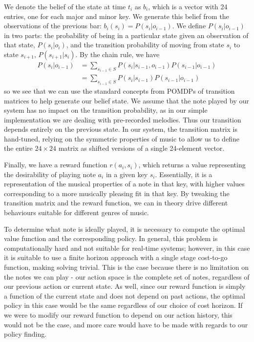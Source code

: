 \documentclass[11pt]{article} %
\begin{document}
We denote the belief of the state at time $t_i$ as $b_i$, which is a vector with 24 entries, one for each major and minor key. We generate this belief from the observations of the previous bar: $b_i(s_i) = P(s_i | o_{i-1})$.  We define $P(s_i | o_{i-1})$ in two parts: the probability of being in a particular state given an observation of that state, $P( s_i | o_i)$, and the transition probability of moving from state $s_i$ to state $s_{i+1}$, $P(s_{i+1} | s_{i})$. By the chain rule, we have
\begin{align*}
P(s_i | o_{i-1}) &= \sum_{s_{i-1} \in S} P(s_i | s_{i-1}, o_{i-1}) P( s_{i-1} | o_{i-1}) \\
&= \sum_{s_{i-1} \in S} P(s_i | s_{i-1}) P( s_{i-1} | o_{i-1})
\end{align*}
so we see that we can use the standard concepts from POMDPs of transition matrices to help generate our belief state. We assume that the note played by our system has no impact on the transition probability, as in our simple implementation we are dealing with pre-recorded melodies. Thus our transition depends entirely on the previous state. In our system, the transition matrix is hand-tuned, relying on the symmetric properties of music to allow us to define the entire $24\times24$ matrix as shifted versions of a single 24-element vector. 

Finally, we have a reward function $r(a_i, s_i)$, which returns a value representing the desirability of playing note $a_i$ in a given key $s_i$. Essentially, it is a representation of the musical properties of a note in that key, with higher values corresponding to a more musically pleasing fit in that key. By tweaking the transition matrix and the reward function, we can in theory drive different behaviours suitable for different genres of music.

To determine what note is ideally played, it is necessary to compute the optimal value function and the corresponding policy. In general, this problem is computationally hard and not suitable for real-time systems; however, in this case it is suitable to use a finite horizon approach with a single stage cost-to-go function, making solving trivial. This is the case because there is no limitation on the notes we can play - our action space is the complete set of notes, regardless of our previous action or current state. As well, since our reward function is simply a function of the current state and does not depend on past actions, the optimal policy in this case would be the same regardless of our choice of cost horizon. If we were to modify our reward function to depend on our action history, this would not be the case, and more care would have to be made with regards to our policy finding.
\end{document}
